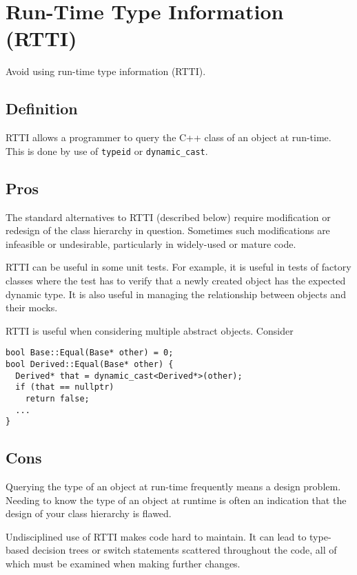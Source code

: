
\section{Run-Time Type Information (RTTI)}\label{sec:run-time-type-information-(rtti)}
Avoid using run-time type information (RTTI).

\subsection{Definition}
RTTI allows a programmer to query the C++ class of an object at run-time. This is done by use of \texttt{typeid} or \texttt{dynamic_cast}.

\subsection{Pros}
The standard alternatives to RTTI (described below) require modification or redesign of the class hierarchy in question. Sometimes such modifications are infeasible or undesirable, particularly in widely-used or mature code.

RTTI can be useful in some unit tests. For example, it is useful in tests of factory classes where the test has to verify that a newly created object has the expected dynamic type. It is also useful in managing the relationship between objects and their mocks.

RTTI is useful when considering multiple abstract objects. Consider
\begin{verbatim}
bool Base::Equal(Base* other) = 0;
bool Derived::Equal(Base* other) {
  Derived* that = dynamic_cast<Derived*>(other);
  if (that == nullptr)
    return false;
  ...
}
\end{verbatim}

\subsection{Cons}
Querying the type of an object at run-time frequently means a design problem. Needing to know the type of an object at runtime is often an indication that the design of your class hierarchy is flawed.

Undisciplined use of RTTI makes code hard to maintain. It can lead to type-based decision trees or switch statements scattered throughout the code, all of which must be examined when making further changes.

